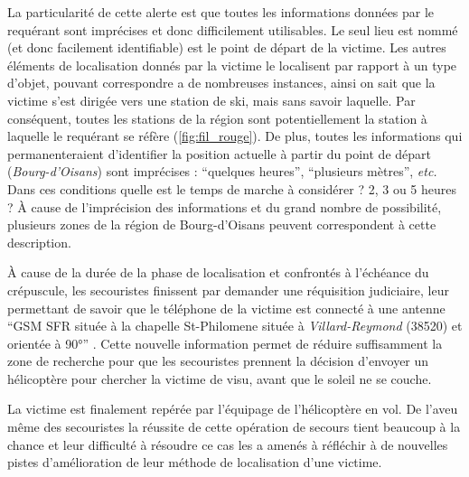 La particularité de cette alerte est que toutes les informations
données par le requérant sont imprécises et donc difficilement
utilisables. Le seul lieu est nommé (et donc facilement identifiable)
est le point de départ de la victime. Les autres éléments de
localisation donnés par la victime le localisent par rapport à un type
d'objet, pouvant correspondre a de nombreuses instances, ainsi on sait
que la victime s'est dirigée vers une station de ski, mais sans savoir
laquelle. Par conséquent, toutes les stations de la région sont
potentiellement la station à laquelle le requérant se réfère
(\autoref{fig:fil_rouge}). De plus, toutes les informations qui
permanenteraient d'identifier la position actuelle à partir du point
de départ (\emph{Bourg-d'Oisans}) sont imprécises : \enquote{quelques
  heures}, \enquote{plusieurs mètres}, \emph{etc.} Dans ces conditions
quelle est le temps de marche à considérer ? 2, 3 ou 5 heures ? À
cause de l'imprécision des informations et du grand nombre de
possibilité, plusieurs zones de la région de Bourg-d'Oisans peuvent
correspondent à cette description.

À cause de la durée de la phase de localisation et confrontés à
l'échéance du crépuscule, les secouristes finissent par demander une
réquisition judiciaire, leur permettant de savoir que le téléphone de
la victime est connecté à une antenne \enquote{GSM SFR située à la
  chapelle St-Philomene située à \emph{Villard-Reymond} (\num{38520})
  et orientée à 90°} \autocite{OlteanuRaimond2017}. Cette nouvelle
information permet de réduire suffisamment la zone de recherche pour
que les secouristes prennent la décision d'envoyer un hélicoptère pour
chercher la victime de visu, avant que le soleil ne se couche.

La victime est finalement repérée par l'équipage de l'hélicoptère en
vol. De l'aveu même des secouristes la réussite de cette opération de
secours tient beaucoup à la chance et leur difficulté à résoudre ce
cas les a amenés à réfléchir à de nouvelles pistes d'amélioration de
leur méthode de localisation d'une victime.

